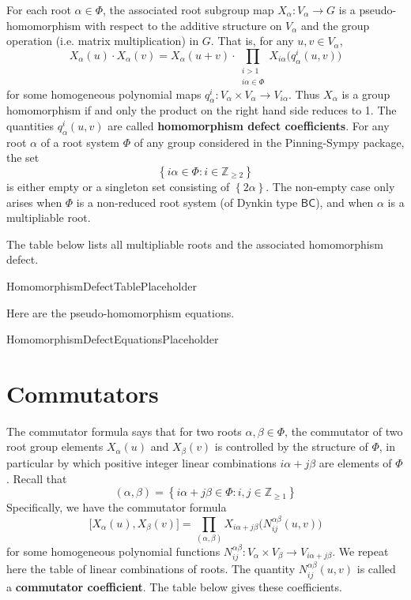 \documentclass[11pt]{article}
\newcommand{\noi}{\noindent}
\newcommand{\tbf}{\textbf}
\newcommand{\lb}{\left\{}
\newcommand{\rb}{\right\}}
\newcommand{\Z}{\mathbb{Z}}
\theoremstyle{definition}
\newif\ifrootsystemreduced
\newif\ifsummablepairs
\begin{document}
\noi For each root $\alpha \in \Phi$, the associated root subgroup map $X_\alpha:V_\alpha \to G$ is a pseudo-homomorphism with respect to the additive structure on $V_\alpha$ and the group operation (i.e. matrix multiplication) in $G$. That is, for any $u,v \in V_\alpha$,
\begin{equation}
\label{pseudo homomorphism}
	X_\alpha(u) \cdot X_\alpha(v) = X_\alpha(u+v) \cdot \prod_{\substack{i > 1 \\ i \alpha \in \Phi}} X_{i \alpha} \Big( q^i_\alpha(u,v) \Big)
\end{equation}
for some homogeneous polynomial maps $q^i_\alpha:V_\alpha \times V_\alpha \to V_{i \alpha}$. Thus $X_\alpha$ is a group homomorphism if and only the product on the right hand side reduces to 1. The quantities $q^i_\alpha(u,v)$ are called \tbf{homomorphism defect coefficients}. For any root $\alpha$ of a root system $\Phi$ of any group considered in the Pinning-Sympy package, the set
\[
	\lb i \alpha \in \Phi : i \in \Z_{\ge 2} \rb
\]
is either empty or a singleton set consisting of $\lb 2 \alpha \rb$. The non-empty case only arises when $\Phi$ is a non-reduced root system (of Dynkin type $\mathsf{BC}$), and when $\alpha$ is a multipliable root. 

\ifrootsystemreduced
Since the root system for this group is reduced, there are no multipliable roots and the product is always empty, hence each $X_\alpha$ is a group homomorphism there are no homomorphism defect coefficients.
\else
The table below lists all multipliable roots and the associated homomorphism defect.

\bigskip

HomomorphismDefectTablePlaceholder

\bigskip

\noi Here are the pseudo-homomorphism equations.

HomomorphismDefectEquationsPlaceholder

\fi

\newpage
\section{Commutators}

The commutator formula says that for two roots $\alpha, \beta \in \Phi$, the commutator of two root group elements $X_\alpha(u)$ and $X_\beta(v)$ is controlled by the structure of $\Phi$, in particular by which positive integer linear combinations $i\alpha + j\beta$ are elements of $\Phi$. Recall that
\[
	(\alpha, \beta) = \lb i \alpha + j\beta \in \Phi : i, j \in \Z_{\ge 1} \rb
\]
Specifically, we have the commutator formula
\[
	\Big[ X_\alpha(u), X_\beta(v) \Big] = \prod_{(\alpha, \beta)} X_{i\alpha + j\beta} \Big( N_{ij}^{\alpha \beta}(u,v) \Big)
\]
for some homogeneous polynomial functions $N_{ij}^{\alpha \beta}:V_{\alpha} \times V_{\beta} \to V_{i\alpha+j\beta}$. 
\ifsummablepairs
We repeat here the table of linear combinations of roots. The quantity $N_{ij}^{\alpha \beta}(u,v)$ is called a \tbf{commutator coefficient}. The table below gives these coefficients.
\end{document}
